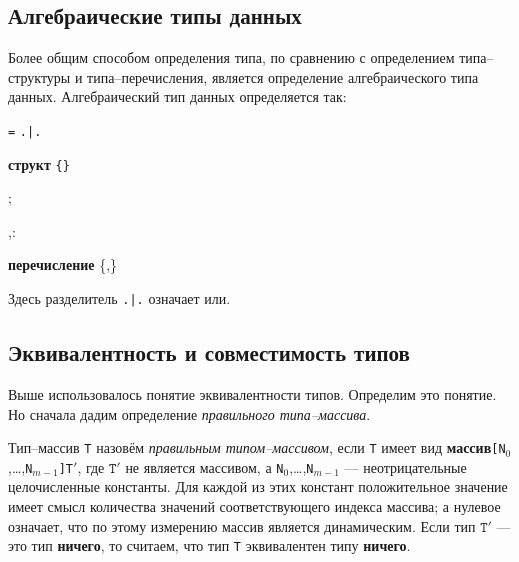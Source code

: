 \documentclass[10pt]{report}
\begin{document}
\subsection{Алгебраические типы данных}
Более общим способом определения типа, по сравнению с определением типа--структуры и типа--перечисления, является определение алгебраического типа данных. Алгебраический тип данных определяется так:

\is{} \texttt{=}  \rbo\texttt{.|.}\rbc\kleene

\sor{}

\is\textbf{структ}  \texttt{\{}\optional\texttt{\}}

\is{}\rbo;\rbc\kleene

\is{}\rbo,\rbc\kleene:

\is{}

\is{}

\is{}

\is\textbf{перечисление} \{\rbo,\rbc\kleene\}

\is{}

Здесь разделитель \texttt{.|.} означает \glqq{}или\grqq.


\subsection{Эквивалентность и совместимость типов}
Выше использовалось понятие эквивалентности типов. Определим это понятие. Но сначала дадим определение \textit{правильного типа--массива}.

Тип--массив \texttt{T} назовём \textit{правильным типом--массивом}, если \texttt{T} имеет вид \textbf{массив}\texttt{[N$_0$},\dots,\texttt{N$_{m-1}$]T}$'$, где $\texttt{T}'$
не является массивом, а \texttt{N$_0$},\dots,\texttt{N$_{m-1}$} --- неотрицательные целочисленные константы. Для каждой из этих констант положительное
значение имеет смысл количества значений соответствующего индекса массива; а нулевое означает, что по этому измерению массив является динамическим. Если тип $\texttt{T}'$
--- это тип \textbf{ничего}, то считаем, что тип \texttt{T} эквивалентен типу \textbf{ничего}.
\end{document}
